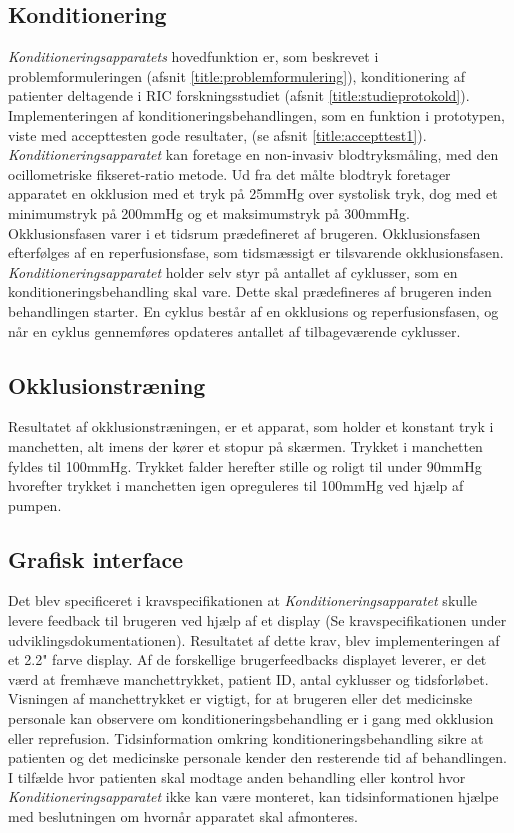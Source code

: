 \subsection{Konditionering}
\textit{Konditioneringsapparatets} hovedfunktion er, som beskrevet i problemformuleringen (afsnit \ref{title:problemformulering}), konditionering af patienter deltagende i RIC forskningsstudiet (afsnit \ref{title:studieprotokold}). Implementeringen af konditioneringsbehandlingen, som en funktion i prototypen, viste med accepttesten gode resultater, (se afsnit \ref{title:accepttest1}). \textit{Konditioneringsapparatet} kan foretage en non-invasiv blodtryksmåling, med den ocillometriske fikseret-ratio metode. Ud fra det målte blodtryk foretager apparatet en okklusion med et tryk på 25mmHg over systolisk tryk, dog med et minimumstryk på 200mmHg og et maksimumstryk på 300mmHg. Okklusionsfasen varer i et tidsrum prædefineret af brugeren. Okklusionsfasen efterfølges af en reperfusionsfase, som tidsmæssigt er tilsvarende okklusionsfasen. \textit{Konditioneringsapparatet} holder selv styr på antallet af cyklusser, som en konditioneringsbehandling skal vare. Dette skal prædefineres af brugeren inden behandlingen starter. En cyklus består af en okklusions og reperfusionsfasen, og når en cyklus gennemføres opdateres antallet af tilbageværende cyklusser. 

\subsection{Okklusionstræning}
Resultatet af okklusionstræningen, er et apparat, som holder et konstant tryk i manchetten, alt imens der kører et stopur på skærmen. Trykket i manchetten fyldes til 100mmHg. Trykket falder herefter stille og roligt til under 90mmHg hvorefter trykket i manchetten igen opreguleres til 100mmHg ved hjælp af pumpen. 
 
\subsection{Grafisk interface}
Det blev specificeret i kravspecifikationen at \textit{Konditioneringsapparatet} skulle levere feedback til brugeren ved hjælp af et display (Se kravspecifikationen under udviklingsdokumentationen). Resultatet af dette krav, blev implementeringen af et 2.2" farve display. Af de forskellige brugerfeedbacks displayet leverer, er det værd at fremhæve manchettrykket, patient ID, antal cyklusser og tidsforløbet. Visningen af manchettrykket er vigtigt, for at brugeren eller det medicinske personale kan observere om konditioneringsbehandling er i gang med okklusion eller reprefusion. Tidsinformation omkring konditioneringsbehandling sikre at patienten og det medicinske personale kender den resterende tid af behandlingen. I tilfælde hvor patienten skal modtage anden behandling eller kontrol hvor \textit{Konditioneringsapparatet} ikke kan være monteret, kan tidsinformationen hjælpe med beslutningen om hvornår apparatet skal afmonteres. 

